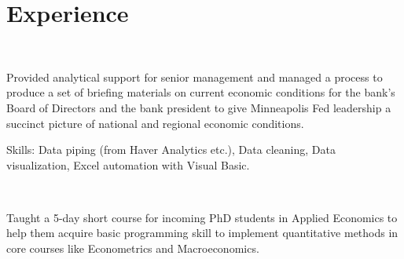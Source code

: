 \documentclass[]{hieudo-build}
\begin{document}
\begin{minipage}[t]{0.65\textwidth} 

\section{Experience}

\\
\vspace{0.9em} %
\begin{tightemize}
\item Provided analytical support for senior management and managed a process to produce a set of briefing materials on current economic conditions for the bank’s Board of Directors and the bank president to give Minneapolis Fed leadership a succinct picture of national and regional economic conditions. 
\item Skills: Data piping (from Haver Analytics etc.), Data cleaning, Data visualization, Excel automation with Visual Basic.
\end{tightemize}
\sectionsep

 \\
\begin{tightemize}
\item Taught a 5-day short course for incoming PhD students in Applied Economics to help them acquire basic programming skill to implement quantitative methods in core courses like Econometrics and Macroeconomics.

\end{tightemize}
\sectionsep


\end{minipage}
\end{document}

